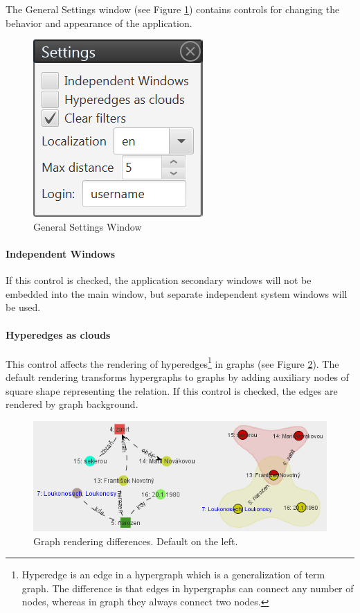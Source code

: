 The General Settings window (see Figure \ref{fig:GeneralSettings}) contains
controls for changing the behavior and appearance of the application.

\begin{figure}[!htb]
        \centering
        \includegraphics{Images/general}
        \caption{General Settings Window}
        \label{fig:GeneralSettings}
\end{figure}

\paragraph{Independent Windows} If this control is checked, the application
secondary windows will not be embedded into the main window, but separate
independent system windows will be used.

\paragraph{Hyperedges as clouds} This control affects the rendering of
hyperedges\footnote{Hyperedge is an edge in a hypergraph which is a
generalization of term graph. The difference is that edges in hypergraphs can
connect any number of nodes, whereas in graph they always connect two nodes.}
in graphs (see Figure \ref{fig:Hypergraphs}). The default rendering transforms
hypergraphs to graphs by adding auxiliary nodes of square shape representing
the relation. If this control is checked, the edges are rendered by graph
background.

\begin{figure}[!htb]
        \centering
        \includegraphics[width=\textwidth]{Images/hypergraphs}
        \caption{Graph rendering differences. Default on the left.}
        \label{fig:Hypergraphs}
\end{figure}

